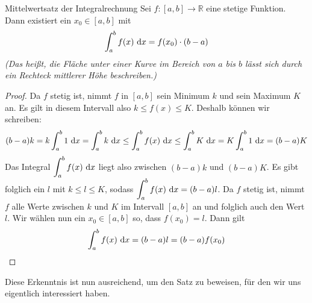 \documentclass[../../main.tex]{subfiles}
\begin{document}
\begin{theorem}{Mittelwertsatz der Integralrechnung}
    Sei $f:[a,b]\rightarrow\mathbb{R}$ eine stetige Funktion. Dann existiert ein $x_0\in[a,b]$ mit \[\int_a^b f(x)\mathop{}\mathrm{d} x=f(x_0)\cdot(b-a)\]
    \textit{(Das heißt, die Fläche unter einer Kurve im Bereich von $a$ bis $b$ lässt sich durch ein Rechteck mittlerer Höhe beschreiben.)}
\end{theorem}
\begin{proof}
    Da $f$ stetig ist, nimmt $f$ in $[a,b]$ sein Minimum $k$ und sein Maximum $K$ an. Es gilt in diesem Intervall also 
    $k\leq f(x)\leq K$. Deshalb können wir schreiben:
    \[(b-a)k=k\int_a^b 1\mathop{}\mathrm{d} x=\int_a^b k\mathop{}\mathrm{d} x\leq\int_a^b f(x)\mathop{}\mathrm{d} x\leq\int_a^b K\mathop{}\mathrm{d} x=K\int_a^b 1\mathop{}\mathrm{d} x=(b-a)K\]
    Das Integral $\displaystyle\int_a^b f(x)\mathop{}\mathrm{d} x$ liegt also zwischen $(b-a)k$ und $(b-a)K$. Es gibt folglich ein $l$ 
    mit $k\leq l\leq K$, sodass $\displaystyle\int_a^b f(x)\mathop{}\mathrm{d} x=(b-a)l$. Da $f$ stetig ist, nimmt $f$ alle Werte zwischen 
    $k$ und $K$ im Intervall $[a,b]$ an und folglich auch den Wert $l$. Wir wählen nun ein $x_0\in[a,b]$ so, dass 
    $f(x_0)=l$. Dann gilt
    \[\int_a^b f(x)\mathop{}\mathrm{d} x=(b-a)l=(b-a)f(x_0)\qedhere\]
\end{proof}
Diese Erkenntnis ist nun ausreichend, um den Satz zu beweisen, für den wir uns eigentlich interessiert haben.
\end{document}
